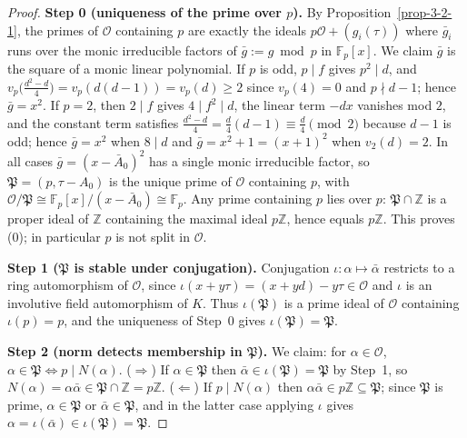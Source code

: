 \begin{proof}
  \textbf{Step 0 (uniqueness of the prime over $p$).}
  By Proposition~\ref{prop-3-2-1}, the primes of $\mathcal{O}$ containing $p$
  are exactly the ideals $p\mathcal{O} + (g_i(\tau))$ where $\bar g_i$ runs over
  the monic irreducible factors of $\bar g := g \bmod p$ in $\mathbb{F}_p[x]$.
  We claim $\bar g$ is the square of a monic linear polynomial. If $p$ is odd,
  $p \mid f$ gives $p^2 \mid d$, and
  $v_p\bigl(\frac{d^2-d}{4}\bigr) = v_p(d(d-1)) = v_p(d) \ge 2$ since $v_p(4)=0$
  and $p \nmid d-1$; hence $\bar g = x^2$. If $p = 2$, then $2 \mid f$ gives
  $4 \mid f^2 \mid d$, the linear term $-dx$ vanishes mod $2$, and the constant
  term satisfies $\frac{d^2-d}{4} = \frac{d}{4}(d-1) \equiv \frac{d}{4} \pmod 2$
  because $d - 1$ is odd; hence $\bar g = x^2$ when $8 \mid d$ and
  $\bar g = x^2 + 1 = (x+1)^2$ when $v_2(d) = 2$. In all cases
  $\bar g = (x - \bar A_0)^2$ has a single monic irreducible factor, so
  $\mathfrak{P} = (p, \tau - A_0)$ is the unique prime of $\mathcal{O}$
  containing $p$, with $\mathcal{O}/\mathfrak{P} \cong
  \mathbb{F}_p[x]/(x - \bar A_0) \cong \mathbb{F}_p$. Any prime containing $p$
  lies over $p$: $\mathfrak{P} \cap \mathbb{Z}$ is a proper ideal of
  $\mathbb{Z}$ containing the maximal ideal $p\mathbb{Z}$, hence equals
  $p\mathbb{Z}$. This proves (0); in particular $p$ is not split in
  $\mathcal{O}$.

  \textbf{Step 1 ($\mathfrak{P}$ is stable under conjugation).}
  Conjugation $\iota : \alpha \mapsto \bar\alpha$ restricts to a ring
  automorphism of $\mathcal{O}$, since $\iota(x + y\tau) = (x + yd) - y\tau
  \in \mathcal{O}$ and $\iota$ is an involutive field automorphism of $K$.
  Thus $\iota(\mathfrak{P})$ is a prime ideal of $\mathcal{O}$ containing
  $\iota(p) = p$, and the uniqueness of Step~0 gives
  $\iota(\mathfrak{P}) = \mathfrak{P}$.

  \textbf{Step 2 (norm detects membership in $\mathfrak{P}$).}
  We claim: for $\alpha \in \mathcal{O}$,
  $\alpha \in \mathfrak{P} \iff p \mid N(\alpha)$.
  ($\Rightarrow$) If $\alpha \in \mathfrak{P}$ then
  $\bar\alpha \in \iota(\mathfrak{P}) = \mathfrak{P}$ by Step~1, so
  $N(\alpha) = \alpha\bar\alpha \in \mathfrak{P} \cap \mathbb{Z} = p\mathbb{Z}$.
  ($\Leftarrow$) If $p \mid N(\alpha)$ then
  $\alpha\bar\alpha \in p\mathbb{Z} \subseteq \mathfrak{P}$; since
  $\mathfrak{P}$ is prime, $\alpha \in \mathfrak{P}$ or
  $\bar\alpha \in \mathfrak{P}$, and in the latter case applying $\iota$ gives
  $\alpha = \iota(\bar\alpha) \in \iota(\mathfrak{P}) = \mathfrak{P}$.


\end{proof}
